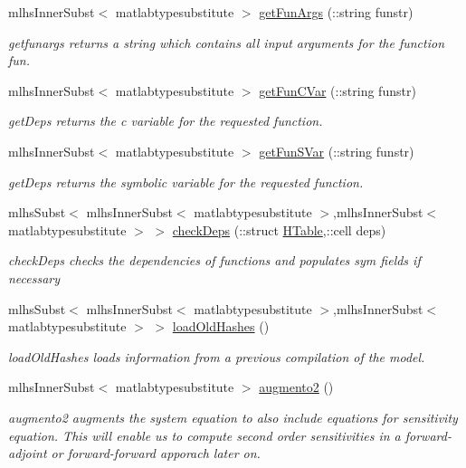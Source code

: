 \begin{DoxyCompactItemize}
mlhs\+Inner\+Subst$<$ matlabtypesubstitute $>$ \hyperlink{classamimodel_a47ece64d988c9c183782a94bd7de3e6b}{get\+Fun\+Args} (\+::string funstr)
\begin{DoxyCompactList}\small\item\em getfunargs returns a string which contains all input arguments for the function fun. \end{DoxyCompactList}\item 
mlhs\+Inner\+Subst$<$ matlabtypesubstitute $>$ \hyperlink{classamimodel_a12e6324d6137b28d7f4363aaf309c140}{get\+Fun\+C\+Var} (\+::string funstr)
\begin{DoxyCompactList}\small\item\em get\+Deps returns the c variable for the requested function. \end{DoxyCompactList}\item 
mlhs\+Inner\+Subst$<$ matlabtypesubstitute $>$ \hyperlink{classamimodel_a08bca7058280eace2b47d57ea04068ef}{get\+Fun\+S\+Var} (\+::string funstr)
\begin{DoxyCompactList}\small\item\em get\+Deps returns the symbolic variable for the requested function. \end{DoxyCompactList}\item 
mlhs\+Subst$<$ mlhs\+Inner\+Subst$<$ matlabtypesubstitute $>$,mlhs\+Inner\+Subst$<$ matlabtypesubstitute $>$ $>$ \hyperlink{classamimodel_aa04dcfc1d2188cae948a75ebd46a6e03}{check\+Deps} (\+::struct \hyperlink{classamimodel_aafe6335df413dd688a2f44efba012cf1}{H\+Table},\+::cell deps)
\begin{DoxyCompactList}\small\item\em check\+Deps checks the dependencies of functions and populates sym fields if necessary \end{DoxyCompactList}\item 
mlhs\+Subst$<$ mlhs\+Inner\+Subst$<$ matlabtypesubstitute $>$,mlhs\+Inner\+Subst$<$ matlabtypesubstitute $>$ $>$ \hyperlink{classamimodel_ab21f46296b0ee0a141c38143a79ad396}{load\+Old\+Hashes} ()
\begin{DoxyCompactList}\small\item\em load\+Old\+Hashes loads information from a previous compilation of the model. \end{DoxyCompactList}\item 
mlhs\+Inner\+Subst$<$ matlabtypesubstitute $>$ \hyperlink{classamimodel_a2c41ab7adc2f815030ba175132e648c5}{augmento2} ()
\begin{DoxyCompactList}\small\item\em augmento2 augments the system equation to also include equations for sensitivity equation. This will enable us to compute second order sensitivities in a forward-\/adjoint or forward-\/forward apporach later on. \end{DoxyCompactList}\end{DoxyCompactItemize}
